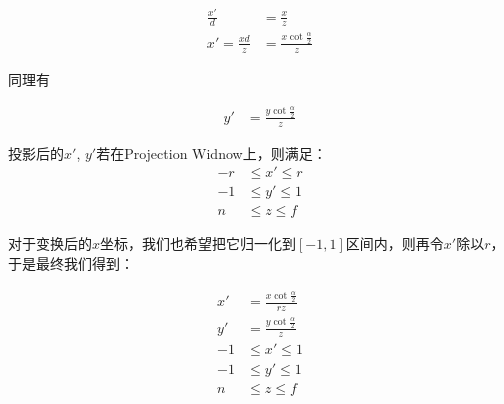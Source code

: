 \documentclass[UTF8]{ctexart}
\begin{document}
\begin{align}
\frac{x'}{d} &= \frac{x}{z} \\
x' = \frac{xd}{z} &= \frac{x\cot\frac{\alpha}{2}}{z}
\end{align}

同理有

\begin{align}
y' &= \frac{y\cot\frac{\alpha}{2}}{z}
\end{align}

投影后的$x'$, $y'$若在Projection Widnow上，则满足：
\begin{align}
 -r& \le x' \le r \\
 -1&\le y' \le 1 \\
 n & \le z \le f 
\end{align}

对于变换后的$x$坐标，我们也希望把它归一化到$[-1,1]$区间内，则再令$x'$除以$r$，于是最终我们得到：

\begin{align}
    x' &= \frac{x\cot\frac{\alpha}{2}}{rz} \\
    y' &= \frac{y\cot\frac{\alpha}{2}}{z} \\
    -1& \le x' \le 1 \\
    -1&\le y' \le 1 \\
    n & \le z \le f 
\end{align}
\end{document}
